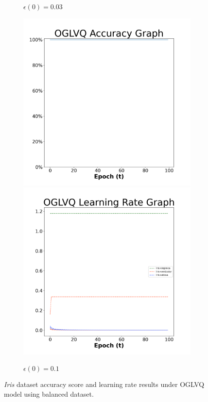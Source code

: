 \begin{figure}[H]
\begin{subfigure}{0.3\textwidth}
  \caption{$\epsilon(0)=0.03$}
\end{subfigure}\hfil %
\begin{subfigure}{0.3\textwidth}
  \includegraphics[width=\linewidth]{images/exper1/iris/OGLVQ_0.1_acc.png}
  \includegraphics[width=\linewidth]{images/exper1/iris/OGLVQ_0.1_lr.png}
  \caption{$\epsilon(0)=0.1$}
\end{subfigure}

\caption{\textit{Iris} dataset accuracy score and learning rate results under OGLVQ model using balanced dataset.}
\end{figure}




